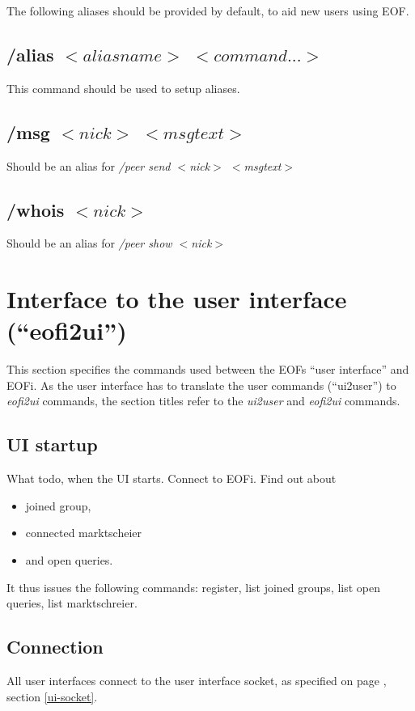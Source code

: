 \documentclass[12pt,a4paper]{book}
\begin{document}
The following aliases should be provided by default,
to aid new users using EOF.
\subsection{/alias $<aliasname>$ $<command...>$}
This command should be used to setup aliases.
\subsection{/msg $<nick>$ $<msgtext>$}
Should be an alias for \textit{/peer send $<$nick$>$ $<$msgtext$>$}
\subsection{/whois $<nick>$}
Should be an alias for \textit{/peer show $<$nick$>$}


\section{Interface to the user interface ("`eofi2ui"')}
\label{eofi2ui}
This section specifies the commands used between the EOFs
"`user interface"' and EOFi. As the user interface has to translate
the user commands ("`ui2user"') to \emph{eofi2ui} commands, the
section titles refer to the \emph{ui2user} and \emph{eofi2ui} commands.
\subsection{UI startup}
What todo, when the UI starts.
Connect to EOFi. Find out about
\begin{itemize}
\item joined group,
\item connected marktscheier
\item and open queries.
\end{itemize}
It thus issues the following commands:
register, list joined groups, list open queries, list marktschreier.
\subsection{Connection}
All user interfaces connect to the user interface socket, as specified
on page \pageref{ui-socket}, section \ref{ui-socket}.
\end{document}
